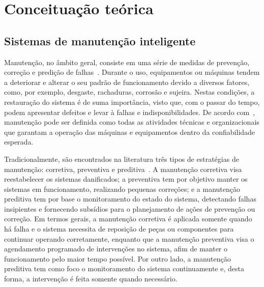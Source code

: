 \chapter{Conceituação teórica}



\section{Sistemas de manutenção inteligente}

Manutenção, no âmbito geral, consiste em uma série de medidas de prevenção, correção e predição de
falhas~\cite{lee2006intelligent}. Durante o uso, equipamentos ou máquinas tendem a deteriorar e
alterar o seu padrão de funcionamento devido a diversos fatores, como, por exemplo, desgaste,
rachaduras, corrosão e sujeira. Nestas condições, a restauração do sistema é de suma importância,
visto que, com o passar do tempo, podem apresentar defeitos e levar à falhas e indisponibilidades.
De acordo com~\cite{marcal2005detectando}, manutenção pode ser definida como todas as atividades
técnicas e organizacionais que garantam a operação das máquinas e equipamentos dentro da
confiabilidade esperada.

Tradicionalmente, são encontrados na literatura três tipos de estratégias de
manutenção: corretiva, preventiva e preditiva~\cite{goncalves2011desenvolvimento}. A manutenção
corretiva visa reestabelecer os sistemas danificados; a preventiva tem por objetivo manter os
sistemas em funcionamento, realizando pequenas correções; e a manutenção preditiva tem por base o
monitoramento do estado do sistema, detectando falhas insipientes e fornecendo subsídios para o
planejamento de ações de prevenção ou correção. Em termos gerais, a manutenção corretiva é aplicada
somente quando há falha e o sistema necessita de reposição de peças ou componentes para continuar
operando corretamente, enquanto que a manutenção preventiva visa o agendamento programado de
intervenções no sistema, afim de manter o funcionamento pelo maior tempo possível. Por outro lado, a
manutenção preditiva tem como foco o monitoramento do sistema continuamente e, desta forma, a
intervenção é feita somente quando necessário.

